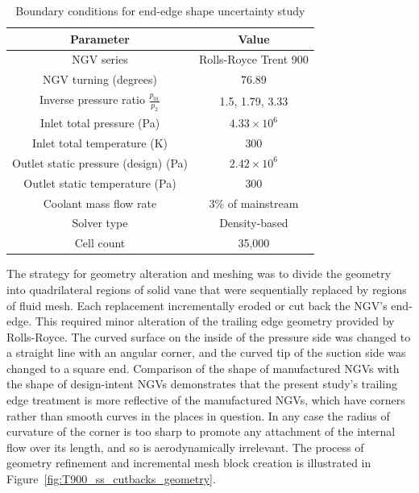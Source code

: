 \documentclass[a4paper, 11pt, oneside]{report}
\begin{document}
\begin{table}[H]
\caption{Boundary conditions for end-edge shape uncertainty study}
\label{ss_cutbacks_parameters}
\begin{center}
\begin{tabular}{|c|c|}
\hline
Parameter & Value\\
\hline
NGV series & Rolls-Royce Trent 900\\
NGV turning (degrees) & 76.89\\
Inverse pressure ratio $\frac{p_{01}}{p_2}$ & 1.5, 1.79, 3.33\\
Inlet total pressure (Pa) & $4.33 \times 10^6$\\
Inlet total temperature (K) & 300\\
Outlet static pressure (design) (Pa) & $2.42 \times 10^6$\\
Outlet static temperature (Pa) & 300\\
Coolant mass flow rate & 3\% of mainstream \\
Solver type & Density-based\\
Cell count & 35,000\\
\hline
\end{tabular}
\end{center}
\end{table}

The strategy for geometry alteration and meshing was to divide the geometry into quadrilateral regions of solid vane that were sequentially replaced by regions of fluid mesh. Each replacement incrementally eroded or cut back the NGV's end-edge. This required minor alteration of the trailing edge geometry provided by Rolls-Royce. The curved surface on the inside of the pressure side was changed to a straight line with an angular corner, and the curved tip of the suction side was changed to a square end. Comparison of the shape of manufactured NGVs with the shape of design-intent NGVs demonstrates that the present study's trailing edge treatment is more reflective of the manufactured NGVs, which have corners rather than smooth curves in the places in question. In any case the radius of curvature of the corner is too sharp to promote any attachment of the internal flow over its length, and so is aerodynamically irrelevant. The process of geometry refinement and incremental mesh block creation is illustrated in Figure~\ref{fig:T900_ss_cutbacks_geometry}.
\end{document}
